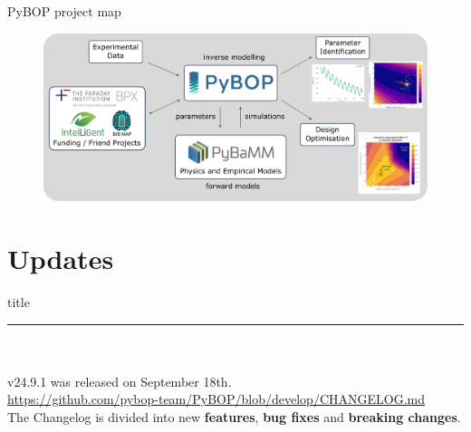 \documentclass[aspectratio=169]{beamer}
\begin{document}
\begin{frame}{PyBOP project map}
    \vspace{-6mm}
    \begin{figure}
        \centering
        \includegraphics[height=0.42\textwidth]{Images/Diagrams/PyBOP-high-level.pdf}
        \label{fig:project_map}
    \end{figure}
\end{frame}

\section{Updates}

\begin{frame}[plain]
    \centering
    \begin{beamercolorbox}[sep=8pt,center,shadow=true,rounded=true]{title}
    \par%
    \color{oxfordblue}\noindent\rule{10cm}{1pt} \\
    \LARGE{\faCloudUpload} \\
    \vspace{6mm} \normalsize
    v24.9.1 was released on September 18th. \\
    \vspace{6mm}
    \href{https://github.com/pybop-team/PyBOP/blob/develop/CHANGELOG.md}{https://github.com/pybop-team/PyBOP/blob/develop/CHANGELOG.md} \\
    \vspace{6mm}
    The Changelog is divided into new \textbf{features},  \textbf{bug fixes} and \textbf{breaking changes}.
    \end{beamercolorbox}
\end{frame}
\end{document}
